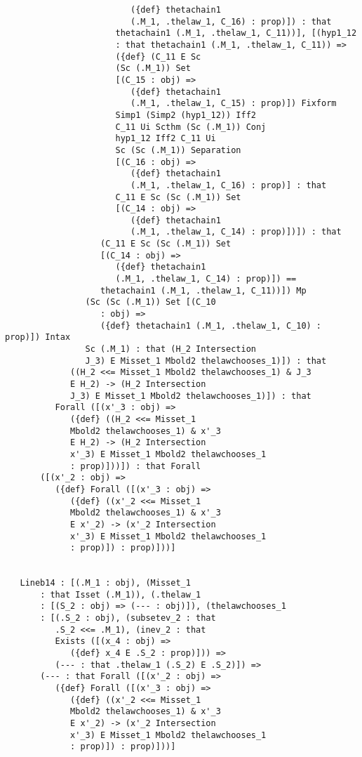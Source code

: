 \documentclass[12pt]{article}
\begin{document}
\begin{verbatim}
                         ({def} thetachain1 
                         (.M_1, .thelaw_1, C_16) : prop)]) : that 
                      thetachain1 (.M_1, .thelaw_1, C_11))], [(hyp1_12 
                      : that thetachain1 (.M_1, .thelaw_1, C_11)) => 
                      ({def} (C_11 E Sc 
                      (Sc (.M_1)) Set 
                      [(C_15 : obj) => 
                         ({def} thetachain1 
                         (.M_1, .thelaw_1, C_15) : prop)]) Fixform 
                      Simp1 (Simp2 (hyp1_12)) Iff2 
                      C_11 Ui Scthm (Sc (.M_1)) Conj 
                      hyp1_12 Iff2 C_11 Ui 
                      Sc (Sc (.M_1)) Separation 
                      [(C_16 : obj) => 
                         ({def} thetachain1 
                         (.M_1, .thelaw_1, C_16) : prop)] : that 
                      C_11 E Sc (Sc (.M_1)) Set 
                      [(C_14 : obj) => 
                         ({def} thetachain1 
                         (.M_1, .thelaw_1, C_14) : prop)])]) : that 
                   (C_11 E Sc (Sc (.M_1)) Set 
                   [(C_14 : obj) => 
                      ({def} thetachain1 
                      (.M_1, .thelaw_1, C_14) : prop)]) == 
                   thetachain1 (.M_1, .thelaw_1, C_11))]) Mp 
                (Sc (Sc (.M_1)) Set [(C_10 
                   : obj) => 
                   ({def} thetachain1 (.M_1, .thelaw_1, C_10) : prop)]) Intax 
                Sc (.M_1) : that (H_2 Intersection 
                J_3) E Misset_1 Mbold2 thelawchooses_1)]) : that 
             ((H_2 <<= Misset_1 Mbold2 thelawchooses_1) & J_3 
             E H_2) -> (H_2 Intersection 
             J_3) E Misset_1 Mbold2 thelawchooses_1)]) : that 
          Forall ([(x'_3 : obj) => 
             ({def} ((H_2 <<= Misset_1 
             Mbold2 thelawchooses_1) & x'_3 
             E H_2) -> (H_2 Intersection 
             x'_3) E Misset_1 Mbold2 thelawchooses_1 
             : prop)]))]) : that Forall 
       ([(x'_2 : obj) => 
          ({def} Forall ([(x'_3 : obj) => 
             ({def} ((x'_2 <<= Misset_1 
             Mbold2 thelawchooses_1) & x'_3 
             E x'_2) -> (x'_2 Intersection 
             x'_3) E Misset_1 Mbold2 thelawchooses_1 
             : prop)]) : prop)]))]


   Lineb14 : [(.M_1 : obj), (Misset_1 
       : that Isset (.M_1)), (.thelaw_1 
       : [(S_2 : obj) => (--- : obj)]), (thelawchooses_1 
       : [(.S_2 : obj), (subsetev_2 : that 
          .S_2 <<= .M_1), (inev_2 : that 
          Exists ([(x_4 : obj) => 
             ({def} x_4 E .S_2 : prop)])) => 
          (--- : that .thelaw_1 (.S_2) E .S_2)]) => 
       (--- : that Forall ([(x'_2 : obj) => 
          ({def} Forall ([(x'_3 : obj) => 
             ({def} ((x'_2 <<= Misset_1 
             Mbold2 thelawchooses_1) & x'_3 
             E x'_2) -> (x'_2 Intersection 
             x'_3) E Misset_1 Mbold2 thelawchooses_1 
             : prop)]) : prop)]))]



\end{verbatim}
\end{document}
